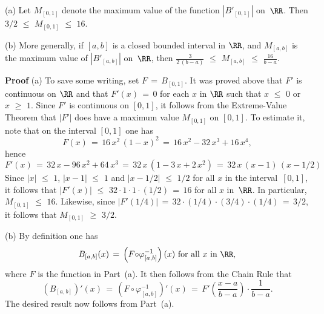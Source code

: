 {\hspace*{\parindent}(a) Let $M_{[0,1]}$ denote the maximum value of the function $\left|B'_{[0,1]}\right|$ on~${\RR}$. Then $3/2\,\,{\leq}\,\,M_{[0,1]}\,\,{\leq}\,\,16$.

\V

        (b) More generally, if $[a,b]$ is a closed bounded interval in ${\RR}$, and $M_{[a,b]}$ is the maximum value of $\left|B'_{[a,b]}\right|$ on~${\RR}$,
    then ${\displaystyle \frac{3}{2\,(b-a)}\,\,{\leq}\,\,M_{[a,b]}\,\,{\leq}\,\,\frac{16}{b-a}}$.

\V

        {\bf Proof} (a) To save some writing, set $F \,=\, B_{[0,1]}$. It was proved above that $F'$ is continuous on ${\RR}$
    and that $F'(x) \,=\, 0$ for each $x$ in ${\RR}$ such that $x\,\,{\leq}\,\,0$ or $x\,\,{\geq}\,\,1$.
    Since $F'$ is continuous on $[0,1]$, it follows from the Extreme-Value Theorem that $|F'|$ does have a maximum value $M_{[0,1]}$ on $[0,1]$.
    To estimate it, note that on the interval $[0,1]$ one has
        \begin{displaymath}
        F(x) \,=\, 16\,x^{2}\,(1-x)^{2} \,=\, 16\,x^{2} -32\,x^{3} + 16\,x^{4},
        \end{displaymath}
    hence
        \begin{displaymath}
        F'(x) \,=\, 32\,x - 96\,x^{2} + 64\,x^{3}
    \,=\,
        32\,x\,(1-3\,x + 2\,x^{2}) \,=\, 32\,x\,(x-1)\,(x-1/2)
        \end{displaymath}
    Since $|x|\,\,{\leq}\,\,1$, $|x-1|\,\,{\leq}\,\,1$ and $|x-1/2|\,\,{\leq}\,\,1/2$ for all $x$ in the interval~$[0,1]$,
it follows that
    $|F'(x)|\,\,{\leq}\,\,32{\cdot}1{\cdot}1{\cdot}(1/2) \,=\, 16$ for all $x$ in~${\RR}$. In particular, $M_{[0,1]}\,\,{\leq}\,\,16$.
    Likewise, since $|F'(1/4)| \,=\, 32{\cdot}(1/4){\cdot}(3/4){\cdot}(1/4) \,=\, 3/2$, it follows that $M_{[0,1]}\,\,{\geq}\,\,3/2$.

\V

        (b) By definition one has
        \begin{displaymath}
        B_{[a,b]}(x) \,=\, \left(F{\circ}{\varphi}^{-1}_{[a,b]}\right)(x) \mbox{ for all $x$ in ${\RR}$},
        \end{displaymath}
 where $F$ is the function in Part~(a). It then follows from the Chain Rule that
        \begin{displaymath}
        (B_{[a,b]})'(x) \,=\,\left(F{\circ}{\varphi}^{-1}_{[a,b]}\right)'(x) \,=\, F'\left(\frac{x-a}{b-a}\right){\cdot}\frac{1}{b-a}.
        \end{displaymath}
    The desired result now follows from Part~(a). \Q

}
